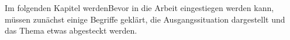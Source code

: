 Im folgenden Kapitel werdenBevor in die Arbeit eingestiegen werden kann, müssen zunächst einige Begriffe geklärt, die Ausgangssituation dargestellt und das Thema etwas abgesteckt werden.







%

